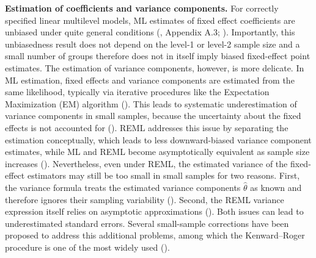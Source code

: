 \documentclass[
  letterpaper,
  11pt,
  english,
  singlespacing,
  headsepline,
  openany]{MastersDoctoralThesis}
\begin{document}
\textbf{Estimation of coefficients and variance components.} For
correctly specified linear multilevel models, ML estimates of fixed
effect coefficients are unbiased under quite general conditions
(, Appendix A.3;
). Importantly, this
unbiasedness result does not depend on the level-1 or level-2 sample
size and a small number of groups therefore does not in itself imply
biased fixed-effect point estimates. The estimation of variance
components, however, is more delicate. In ML estimation, fixed effects
and variance components are estimated from the same likelihood,
typically via iterative procedures like the Expectation Maximization
(EM) algorithm (). This leads to systematic underestimation of variance components in
small samples, because the uncertainty about the fixed effects is not
accounted for (). REML addresses this issue by separating the estimation
conceptually, which leads to less downward-biased variance component
estimates, while ML and REML become asymptotically equivalent as sample
size increases ().
Nevertheless, even under REML, the estimated variance of the
fixed-effect estimators may still be too small in small samples for two
reasons. First, the variance formula treats the estimated variance
components \(\hat{\theta}\) as known and therefore ignores their
sampling variability (). Second, the REML variance expression itself relies on asymptotic
approximations (). Both issues
can lead to underestimated standard errors. Several small-sample
corrections have been proposed to address this additional problems,
among which the Kenward--Roger procedure is one of the most widely used
().
\end{document}
